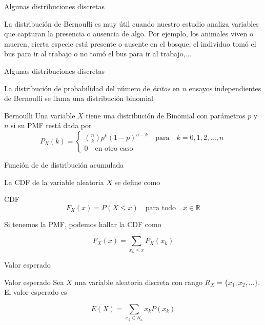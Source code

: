 \documentclass{beamer}
\begin{document}
\begin{frame}{Algunas distribuciones discretas}

La distribución de Bernoulli es muy útil cuando nuestro estudio analiza variables que capturan la presencia o ausencia de algo. Por ejemplo, los animales viven o mueren, cierta especie está presente o ausente en el bosque, el individuo tomó el bus para ir al trabajo o no tomó el bus para ir al trabajo,...
    
\end{frame}

\begin{frame}{Algunas distribuciones discretas}

La distribución de probabilidad del número de \textit{éxitos} en $n$ ensayos independientes de Bernoulli se llama una distribución binomial

\begin{block}{Bernoulli}
    Una variable $X$ tiene una distribución de Binomial con parámetros $p$ y $n$ si su PMF restá dada por
    \begin{equation*}
    P_X(k)=
        \begin{cases}
        \binom{n}{k}p^k(1-p)^{n-k} \quad \text{para}\quad k=0,1,2,...,n\\
        0 \quad \text{en otro caso}
        \end{cases}
    \end{equation*}
\end{block}
    
\end{frame}

\begin{frame}{Función de de distribución acumulada}

La CDF de la variable aleatoria $X$ se define como 
\begin{block}{CDF}
\begin{equation*}
F_X(x)=P(X\leq x)    \quad \text{para todo} \quad x\in \mathbb{R}
\end{equation*}
    
\end{block}

Si tenemos la PMF, podemos hallar la CDF como

\begin{equation*}
    F_X(x)=\sum_{x_k\leq x}P_X(x_k)
\end{equation*}
    
\end{frame}

\begin{frame}{Valor esperado}

\begin{block}{Valor esperado}
    Sea $X$ una variable aleatoria discreta con rango $R_X=\{x_1,x_2,...\}$. El valor esperado es

    \begin{equation*}
        E(X)=\sum_{x_k\in R_x}x_kP(x_k)
    \end{equation*}
\end{block}
    
\end{frame}
\end{document}
